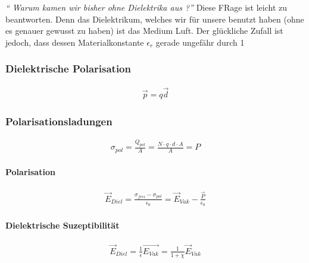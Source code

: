 \textit{\quote  "` Warum kamen wir bisher ohne Dielektrika aus ?"'}
Diese FRage ist leicht zu beantworten. Denn das Dielektrikum, welches wir für unsere benutzt haben (ohne es genauer gewusst zu haben) ist das Medium Luft. Der glückliche Zufall ist jedoch, dass dessen Materialkonstante $\epsilon_r$ gerade ungefähr durch 1  
\subsubsection{Dielektrische Polarisation}
\begin{align} \label{eqn:Polarisation}
\vec{p} = q \vec{d}
\end{align}

\subsubsection{Polarisationsladungen}
\begin{align} \label{eqn:Polarisationsladung}
\sigma_{pol}= \frac{Q_{pol}}{A} = \frac{N \cdot q \cdot d \cdot A}{A} = P
\end{align}

	\paragraph{Polarisation}\begin{align} \label{eqn:Polarisation Überlagerung}
\vec{E}_{Diel} = \frac{\sigma_{frei} - \sigma_{pol}}{\epsilon_0} = \vec{E}_{Vak} - \frac{\vec{P}}{\epsilon_0}
\end{align}

\paragraph{Dielektrische Suzeptibilität}
\begin{align} \label{eqn:Dielektrika Feldstärke}
\boxed{\vec{E}_{Diel} = \frac{1}{\epsilon} \vec{E_{Vak}} = \frac{1}{1+ \chi} \vec{E}_{Vak}}
\end{align}
